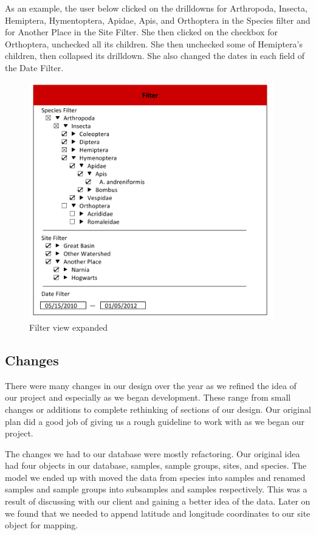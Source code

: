 As an example, the user below clicked on the drilldowns for Arthropoda, Insecta, Hemiptera, Hymentoptera, Apidae, Apis, and Orthoptera in the Species filter and for Another Place in the Site Filter. She then clicked on the checkbox for Orthoptera, unchecked all its children. She then unchecked some of Hemiptera’s children, then collapsed its drilldown. She also changed the dates in each field of the Date Filter.

\begin{figure}[h]
	\centering
	\includegraphics[width=0.95\textwidth]{filterinuse.png}
	\captionsetup{justification=centering}
	\caption{
		Filter view expanded
	}
	\label{fig:filter_mockup_in_use}
\end{figure}

\subsection{Changes}
There were many changes in our design over the year as we refined the idea of our project and especially as we began development.
These range from small changes or additions to complete rethinking of sections of our design.
Our original plan did a good job of giving us a rough guideline to work with as we began our project.

The changes we had to our database were mostly refactoring.
Our original idea had four objects in our database, samples, sample groups, sites, and species.
The model we ended up with moved the data from species into samples and renamed samples and sample groups into subsamples and samples respectively.
This was a result of discussing with our client and gaining a better idea of the data.
Later on we found that we needed to append latitude and longitude coordinates to our site object for mapping.

